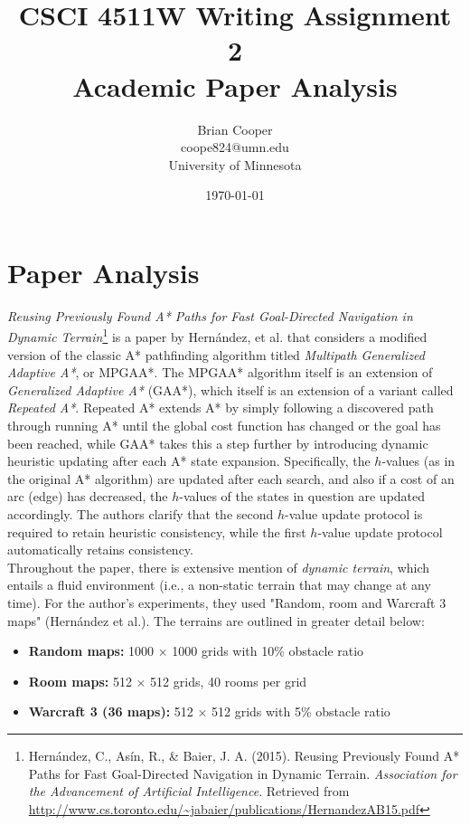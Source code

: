 \documentclass{article}
\title{CSCI 4511W Writing Assignment 2 \\
        \large Academic Paper Analysis
      }
\author{Brian Cooper \\ coope824@umn.edu \\ University of Minnesota}
\date{\today}
\begin{document}
\maketitle

\section{Paper Analysis}
\textit{Reusing Previously Found A* Paths for Fast Goal-Directed Navigation
in Dynamic Terrain}\footnote{Hern\'andez, C., As\'in, R., & Baier, J. A. (2015). Reusing Previously Found A* Paths for Fast Goal-Directed Navigation in Dynamic Terrain. \textit{Association for the Advancement of Artificial Intelligence}. Retrieved from \url{http://www.cs.toronto.edu/~jabaier/publications/HernandezAB15.pdf}} is a paper by Hern\'andez, et al. that considers a modified version of the classic A* pathfinding algorithm titled \textit{Multipath Generalized Adaptive A*}, or MPGAA*. The MPGAA* algorithm itself is an extension of \textit{Generalized Adaptive A*} (GAA*), which itself is an extension of a variant called \textit{Repeated A*}. Repeated A* extends A* by simply following a discovered path through running A* until the global cost function has changed or the goal has been reached, while GAA* takes this a step further by introducing dynamic heuristic updating after each A* state expansion. Specifically, the $h$-values (as in the original A* algorithm) are updated after each search, and also if a cost of an arc (edge) has decreased, the $h$-values of the states in question are updated accordingly. The authors clarify that the second $h$-value update protocol is required to retain heuristic consistency, while the first $h$-value update protocol automatically retains consistency. \\

Throughout the paper, there is extensive mention of \textit{dynamic terrain}, which entails a fluid environment (i.e., a non-static terrain that may change at any time). For the author's experiments, they used "Random, room and Warcraft 3 maps" (Hern\'andez et al.). The terrains are outlined in greater detail below:
\begin{itemize}
\item \textbf{Random maps:} 1000 $\times$ 1000 grids with 10\% obstacle ratio
\item \textbf{Room maps:} 512 $\times$ 512 grids, 40 rooms per grid
\item \textbf{Warcraft 3 (36 maps):} 512 $\times$ 512 grids with 5\% obstacle ratio
\end{itemize}
\end{document}

